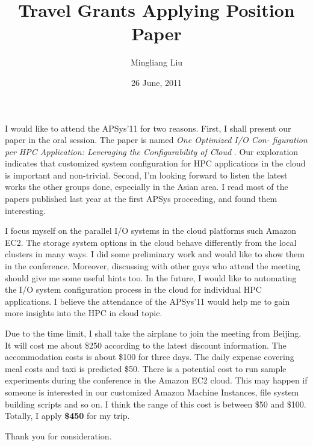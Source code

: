 \documentclass{article}
\title{Travel Grants Applying Position Paper}
\author{Mingliang Liu}
\date{26 June, 2011}
\begin{document}
\maketitle

I would like to attend the APSys'11 for two reasons. First, I shall present
our paper in the oral session. The paper is named \textit{One Optimized I/O Con-
figuration per HPC Application: Leveraging the Configurability of Cloud }. Our
exploration indicates that customized system configuration for HPC
applications in the cloud is important and non-trivial. Second, I'm looking
forward to listen the latest works the other groups done, especially in the
Asian area. I read most of the papers published last year at the first APSys
proceeding, and found them interesting.

I focus myself on the parallel I/O systems in the cloud platforms such Amazon
EC2. The storage system options in the cloud behave differently from the local
clusters in many ways. I did some preliminary work and would like to show them
in the conference. Moreover, discussing with other guys who attend the meeting
should give me some useful hints too. In the future, I would like to
automating the I/O system configuration process in the cloud for individual
HPC applications. I believe the attendance of the APSys'11 would help me to
gain more insights into the HPC in cloud topic.

\vspace{.5cm}
Due to the time limit, I shall take the airplane to join the meeting from
Beijing. It will cost me about \$250 according to the latest discount
information. The accommodation costs is about \$100 for three days. The daily
expense covering meal costs and taxi is predicted \$50. There is a potential
cost to run sample experiments during the conference in the Amazon EC2 cloud.
This may happen if someone is interested in our customized Amazon Machine
Instances, file system building scripts and so on. I think the range of this
cost is between \$50 and \$100. Totally, I apply \textbf{\$450} for my trip.

\vspace{.5cm}
Thank you for consideration.
\end{document}

